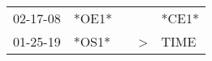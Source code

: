 \begin{supertabular}{p{0.07\textwidth}p{0.06\textwidth}p{0.02\textwidth}p{0.02\textwidth}p{0.06\textwidth}}
 02-17-08\textsuperscript{} &  *OE1* &   &               &                   *CE1* \\
 01-25-19\textsuperscript{} &  *OS1* &   &  \textgreater &  TIME\textsuperscript{} \\
\end{supertabular}
